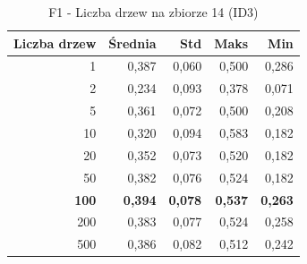 \begin{table}[htbp]
\centering
\small
\setlength{\tabcolsep}{6pt}
\renewcommand{\arraystretch}{1.2}
\caption{F1 - Liczba drzew na zbiorze 14 (ID3)}
\label{tab:ID3_tree_count_14_f1}
\begin{tabular}{r|r|r|r|r}
\toprule
Liczba drzew & Średnia & Std & Maks & Min \\
\hline
1 & 0,387 & 0,060 & 0,500 & 0,286 \\
2 & 0,234 & 0,093 & 0,378 & 0,071 \\
5 & 0,361 & 0,072 & 0,500 & 0,208 \\
10 & 0,320 & 0,094 & 0,583 & 0,182 \\
20 & 0,352 & 0,073 & 0,520 & 0,182 \\
50 & 0,382 & 0,076 & 0,524 & 0,182 \\
\textbf{100} & \textbf{0,394} & \textbf{0,078} & \textbf{0,537} & \textbf{0,263} \\
200 & 0,383 & 0,077 & 0,524 & 0,258 \\
500 & 0,386 & 0,082 & 0,512 & 0,242 \\
\bottomrule
\end{tabular}
\end{table}